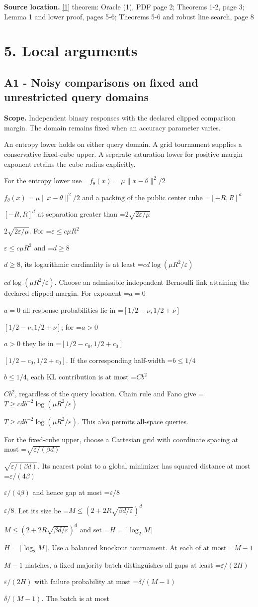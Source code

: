 \documentclass[10pt,a4paper]{article}
\newcommand{\AtlasMath}[1]{\par\begingroup\centering\setbox0=\hbox{$\displaystyle #1$}\ifdim\wd0>1.4\linewidth\typeout{ATLAS WIDE FORMULA: \the\wd0}\fi\ifdim\wd0>\linewidth\resizebox{\linewidth}{!}{\box0}\else\box0\fi\par\endgroup}
\newcommand{\AtlasInlineMath}[1]{\begingroup\setbox0=\hbox{$#1$}\ifdim\wd0>.4\linewidth\endgroup\AtlasMath{#1}\else\endgroup$#1$\fi}
\begin{document}
\textbf{Source location.} \href{https://papers.nips.cc/paper_files/paper/2012/file/e6d8545daa42d5ced125a4bf747b3688-Paper.pdf}{[1]} theorem: Oracle (1), PDF page 2; Theorems 1-2, page 3; Lemma 1 and lower proof, pages 5-6; Theorems 5-6 and robust line search, page 8

\section{5. Local arguments}
\subsection{A1 - Noisy comparisons on fixed and unrestricted query domains}
\textbf{Scope.} Independent binary responses with the declared clipped comparison margin. The domain remains fixed when an accuracy parameter varies.

An entropy lower holds on either query domain. A grid tournament supplies a conservative fixed-cube upper. A separate saturation lower for positive margin exponent retains the cube radius explicitly.

For the entropy lower use \AtlasInlineMath{f_\theta(x)=\mu\|x-\theta\|^2/2} and a packing of the public center cube \AtlasInlineMath{[-R,R]^d} at separation greater than \AtlasInlineMath{2\sqrt{2\varepsilon/\mu}}. For \AtlasInlineMath{\varepsilon\le c\mu R^2} and \AtlasInlineMath{d\ge8}, its logarithmic cardinality is at least \AtlasInlineMath{cd\log(\mu R^2/\varepsilon)}. Choose an admissible independent Bernoulli link attaining the declared clipped margin. For exponent \AtlasInlineMath{a=0} all response probabilities lie in \AtlasInlineMath{[1/2-\nu,1/2+\nu]}; for \AtlasInlineMath{a>0} they lie in \AtlasInlineMath{[1/2-c_0,1/2+c_0]}. If the corresponding half-width \AtlasInlineMath{b\le1/4}, each KL contribution is at most \AtlasInlineMath{Cb^2}, regardless of the query location. Chain rule and Fano give \AtlasInlineMath{T\ge cd b^{-2}\log(\mu R^2/\varepsilon)}. This also permits all-space queries.

For the fixed-cube upper, choose a Cartesian grid with coordinate spacing at most \AtlasInlineMath{\sqrt{\varepsilon/(\beta d)}}. Its nearest point to a global minimizer has squared distance at most \AtlasInlineMath{\varepsilon/(4\beta)} and hence gap at most \AtlasInlineMath{\varepsilon/8}. Let its size be \AtlasInlineMath{M\le(2+2R\sqrt{\beta d/\varepsilon})^d} and set \AtlasInlineMath{H=\lceil\log_2M\rceil}. Use a balanced knockout tournament. At each of at most \AtlasInlineMath{M-1} matches, a fixed majority batch distinguishes all gaps at least \AtlasInlineMath{\varepsilon/(2H)} with failure probability at most \AtlasInlineMath{\delta/(M-1)}. The batch is at most
\end{document}
